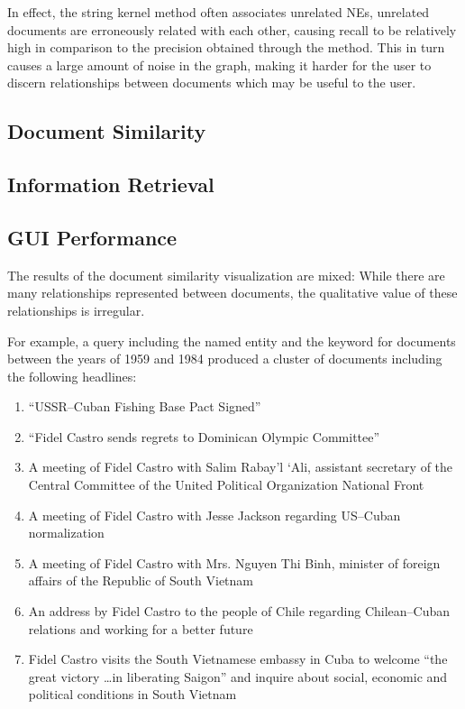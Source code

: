 In effect, the string kernel method often associates unrelated NEs, unrelated documents are erroneously related with each other, causing recall to be relatively high in comparison to the precision obtained through the method. This in turn causes a large amount of noise in the graph, making it harder for the user to discern relationships between documents which may be useful to the user.

\subsection {Document Similarity}
\label{sec:document_similarity}

\subsection {Information Retrieval}
\label{sec:information_retrieval}

\subsection {GUI Performance}
\label{sec:gui_performance}
The results of the document similarity visualization are mixed: While there are many relationships represented between documents, the qualitative value of these relationships is irregular.

For example, a query including the named entity  and the keyword  for documents between the years of 1959 and 1984 produced a cluster of documents including the following headlines:

\begin{enumerate}
\item ``USSR--Cuban Fishing Base Pact Signed''\label{eval:doc179}
\item ``Fidel Castro sends regrets to Dominican Olympic Committee''\label{eval:doc553}
\item A meeting of Fidel Castro with Salim Rabay'l `Ali, assistant secretary of the Central Committee of the United Political Organization National Front\label{eval:doc682}
\item A meeting of Fidel Castro with Jesse Jackson regarding US--Cuban normalization\label{eval:doc879}
\item A meeting of Fidel Castro with Mrs. Nguyen Thi Binh, minister of foreign affairs of the Republic of South Vietnam\label{eval:doc643}
\item An address by Fidel Castro to the people of Chile regarding Chilean--Cuban relations and working for a better future\label{eval:doc391}
\item Fidel Castro visits the South Vietnamese embassy in Cuba to welcome ``the great victory \ldots in liberating Saigon'' and inquire about social, economic and political conditions in South Vietnam\label{eval:doc626}
\end{enumerate} 

